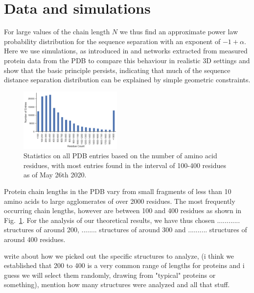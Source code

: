 \documentclass[
reprint,
twocolumn,
amsmath,amssymb,superscriptaddress,aps,
pre]{revtex4-1}
\newcommand{\red}[1]{\textcolor{red!80!black}{#1}}
\begin{document}
\section*{Data and simulations}
 For large values of the chain length $N$ we thus find an approximate power law probability distribution for the sequence separation with an exponent of $-1+\alpha$. Here we use simulations, as introduced in \cite{molkenthin2020self} and networks extracted from measured protein data from the PDB \cite{PDB} to compare this behaviour in realistic 3D settings and show that the basic principle persists, indicating that much of the sequence distance separation distribution can be explained by simple geometric constraints.
 \begin{figure}[h]
        \centering
	\includegraphics[width=0.45\textwidth]{figures/pdb_statistics.pdf}
        \caption{Statistics on all PDB entries based on the number of amino acid residues, with most entries found in the interval of 100-400 residues as of May 26th 2020.}
        \label{fig:pdb_stats}
\end{figure}

Protein chain lengths in the PDB vary from small fragments of less than 10 amino acids to large agglomerates of over 2000 residues. The most frequently occurring chain lengths, however are between 100 and 400 residues as shown in Fig.~\ref{fig:pdb_stats}. For the analysis of our theoretical results, we have thus chosen ............ structures of around 200, ........ structures of around 300 and .......... structures of around 400 residues.

 \red{write about how we picked out the specific structures to analyze, (i think we established that 200 to 400 is a very common range of lengths for proteins and i guess we will select them randomly, drawing from "typical" proteins or something), mention how many structures were analyzed and all that stuff.}
 
\end{document}
